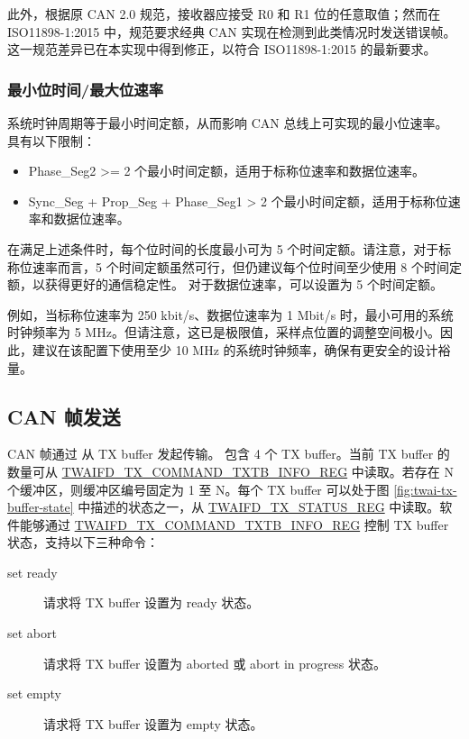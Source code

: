 \documentclass[main\_\_CN.tex]{subfiles}
\begin{document}
此外，根据原 CAN 2.0 规范，接收器应接受 R0 和 R1 位的任意取值；然而在 ISO11898-1:2015 中，规范要求经典 CAN 实现在检测到此类情况时发送错误帧。这一规范差异已在本实现中得到修正，以符合 ISO11898-1:2015 的最新要求。


\subsubsection{最小位时间/最大位速率}

系统时钟周期等于最小时间定额，从而影响 CAN 总线上可实现的最小位速率。\modulename{} 具有以下限制：

\begin{itemize}
    \item Phase\_Seg2 >= 2 个最小时间定额，适用于标称位速率和数据位速率。
    \item Sync\_Seg + Prop\_Seg + Phase\_Seg1 > 2 个最小时间定额，适用于标称位速率和数据位速率。
\end{itemize}

在满足上述条件时，每个位时间的长度最小可为 5 个时间定额。请注意，对于标称位速率而言，5 个时间定额虽然可行，但仍建议每个位时间至少使用 8 个时间定额，以获得更好的通信稳定性。
对于数据位速率，可以设置为 5 个时间定额。

例如，当标称位速率为 250 kbit/s、数据位速率为 1 Mbit/s 时，最小可用的系统时钟频率为 5 MHz。但请注意，这已是极限值，采样点位置的调整空间极小。因此，建议在该配置下使用至少 10 MHz 的系统时钟频率，确保有更安全的设计裕量。


\subsection{CAN 帧发送}
\label{sec:twai-can-frame-trans}

CAN 帧通过 \modulename{} 从 TX buffer 发起传输。\modulename{} 包含 4 个 TX buffer。当前 TX buffer 的数量可从 \hyperref[regdesc:TWAIFDTXCOMMANDTXTBINFOREG]{TWAIFD\_TX\_COMMAND\_TXTB\_INFO\_REG} 中读取。若存在 N 个缓冲区，则缓冲区编号固定为 1 至 N。每个 TX buffer 可以处于图 \ref{fig:twai-tx-buffer-state} 中描述的状态之一，从 \hyperref[regdesc:TWAIFDTXSTATUSREG]{TWAIFD\_TX\_STATUS\_REG} 中读取。软件能够通过 \hyperref[regdesc:TWAIFDTXCOMMANDTXTBINFOREG]{TWAIFD\_TX\_COMMAND\_TXTB\_INFO\_REG} 控制 TX buffer 状态，支持以下三种命令：

\begin{description}
    \item [set ready] 请求将 TX buffer 设置为 ready 状态。
    \item [set abort] 请求将 TX buffer 设置为 aborted 或 abort in progress 状态。
    \item [set empty] 请求将 TX buffer 设置为 empty 状态。
\end{description}
\end{document}
